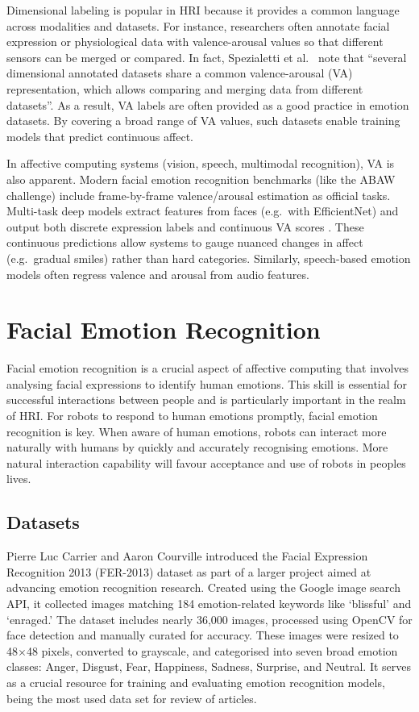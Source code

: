 Dimensional labeling is popular in HRI because it provides a common language across modalities and datasets. For instance, researchers often annotate facial expression or physiological data with valence-arousal values so that different sensors can be merged or compared. In fact, Spezialetti et al.\ \cite{Spezialetti2020-ty} note that ``several dimensional annotated datasets share a common valence-arousal (VA) representation, which allows comparing and merging data from different datasets''. As a result, VA labels are often provided as a good practice in emotion datasets. By covering a broad range of VA values, such datasets enable training models that predict continuous affect.

In affective computing systems (vision, speech, multimodal recognition), VA is also apparent. Modern facial emotion recognition benchmarks (like the ABAW challenge) include frame-by-frame valence/arousal estimation as official tasks. Multi-task deep models extract features from faces (e.g.\ with EfficientNet) and output both discrete expression labels and continuous VA scores \cite{Savchenko2024-ns}. These continuous predictions allow systems to gauge nuanced changes in affect (e.g.\ gradual smiles) rather than hard categories. Similarly, speech-based emotion models often regress valence and arousal from audio features.

\section{Facial Emotion Recognition}

Facial emotion recognition is a crucial aspect of affective computing \cite{Picard2000-mt} that involves analysing facial expressions to identify human emotions. This skill is essential for successful interactions between people and is particularly important in the realm of HRI. For robots to respond to human emotions promptly, facial emotion recognition is key. When aware of human emotions, robots can interact more naturally with humans by quickly and accurately recognising emotions. More natural interaction capability will favour acceptance and use of robots in peoples lives.

\subsection{Datasets}

Pierre Luc Carrier and Aaron Courville \cite{Goodfellow2013-al} introduced the Facial Expression Recognition 2013 (FER-2013) dataset as part of a larger project aimed at advancing emotion recognition research. Created using the Google image search API, it collected images matching 184 emotion-related keywords like `blissful' and `enraged.' The dataset includes nearly 36,000 images, processed using OpenCV for face detection and manually curated for accuracy. These images were resized to 48\(\times\)48 pixels, converted to grayscale, and categorised into seven broad emotion classes: Anger, Disgust, Fear, Happiness, Sadness, Surprise, and Neutral.  It serves as a crucial resource for training and evaluating emotion recognition models, being the most used data set for review of articles.

